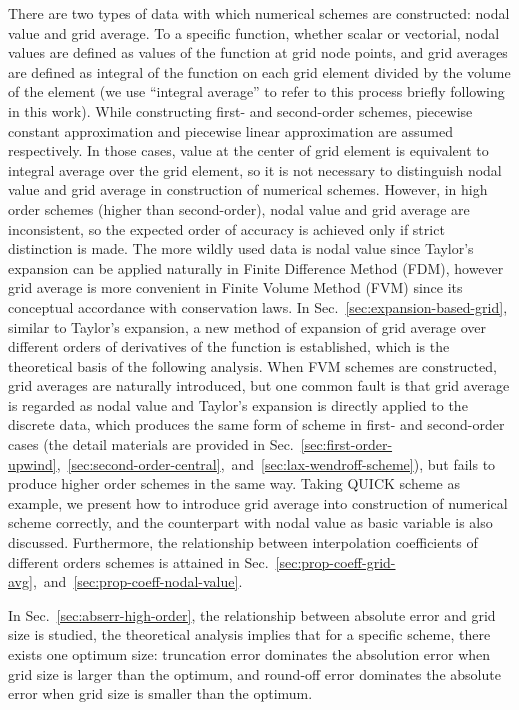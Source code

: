 \documentclass[]{article}
\begin{document}
There are two types of data with which numerical schemes are constructed: nodal
value and grid average. To a specific function, whether scalar or vectorial,
nodal values are defined as values of the function at grid node points,
and grid averages are defined as integral of the function on each
grid element divided by the volume of the element (we use ``integral
average'' to refer to this process briefly following in this work).
While constructing first- and second-order schemes, piecewise constant
approximation and piecewise linear approximation are assumed respectively.
In those cases, value at the center of grid element is equivalent to integral average 
over the grid element, so it is not necessary to distinguish nodal value and grid
average in construction of numerical schemes. However, in high order schemes
(higher than second-order), nodal value and grid average are inconsistent,
so the expected order of accuracy is achieved only if strict distinction is made.
The more wildly used data is nodal value since Taylor's
expansion can be applied naturally in Finite Difference Method (FDM), however
grid average is more convenient in Finite Volume Method (FVM) since its
conceptual accordance with conservation laws. 
In Sec.~\ref{sec:expansion-based-grid}, similar to Taylor's expansion, a new
method of expansion of grid average over different orders of derivatives of the
function is established, which is the theoretical basis of the following
analysis. 
When FVM schemes are constructed, grid averages are naturally introduced, but 
one common fault is that grid average is regarded as nodal value
and Taylor's expansion is directly applied to the discrete data, 
which produces the same form of scheme in first- and
second-order cases (the detail materials are provided in 
Sec.~\ref{sec:first-order-upwind},~\ref{sec:second-order-central},~and~\ref{sec:lax-wendroff-scheme}),
but fails to produce higher order
schemes in the same way. Taking QUICK scheme as example, we present how to
introduce grid average into
construction of numerical scheme correctly, and the counterpart with nodal value
as basic variable is also discussed.
Furthermore, the relationship between interpolation
coefficients of different orders schemes is attained in
Sec.~\ref{sec:prop-coeff-grid-avg},~and~\ref{sec:prop-coeff-nodal-value}.

In Sec.~\ref{sec:abserr-high-order}, the relationship between
absolute error and grid size is studied, the theoretical analysis
implies that for a specific scheme, there exists one optimum size:
truncation error dominates the absolution error when grid size is larger
than the optimum, and round-off error dominates the absolute error when
grid size is smaller than the optimum. 
\end{document}
